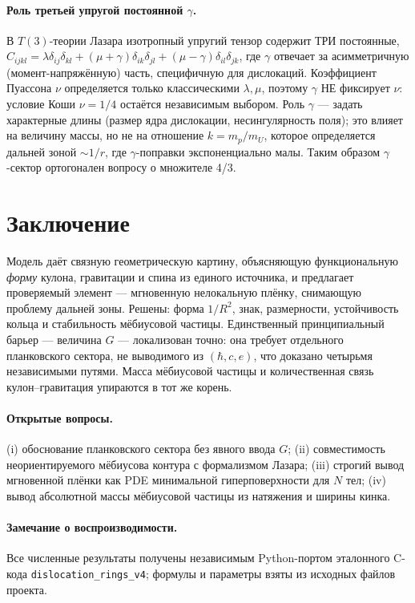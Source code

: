 \documentclass[11pt,a4paper]{article}
\begin{document}
\paragraph{Роль третьей упругой постоянной $\gamma$.} В $T(3)$-теории Лазара
изотропный упругий тензор содержит ТРИ постоянные,
$C_{ijkl}=\lambda\delta_{ij}\delta_{kl}+(\mu+\gamma)\delta_{ik}\delta_{jl}
+(\mu-\gamma)\delta_{il}\delta_{jk}$, где $\gamma$ отвечает за асимметричную
(момент-напряжённую) часть, специфичную для дислокаций. Коэффициент Пуассона
$\nu$ определяется только классическими $\lambda,\mu$, поэтому $\gamma$ НЕ
фиксирует $\nu$: условие Коши $\nu=1/4$ остаётся независимым выбором. Роль
$\gamma$ — задать характерные длины (размер ядра дислокации, несингулярность
поля); это влияет на величину массы, но не на отношение $k=m_p/m_U$, которое
определяется дальней зоной $\sim1/r$, где $\gamma$-поправки экспоненциально
малы. Таким образом $\gamma$-сектор ортогонален вопросу о множителе 4/3.

\section{Заключение}
Модель даёт связную геометрическую картину, объясняющую функциональную
\emph{форму} кулона, гравитации и спина из единого источника, и предлагает
проверяемый элемент --- мгновенную нелокальную плёнку, снимающую проблему
дальней зоны. Решены: форма $1/R^2$, знак, размерности, устойчивость кольца
и стабильность мёбиусовой частицы. Единственный принципиальный барьер ---
величина $G$ --- локализован точно: она требует отдельного планковского
сектора, не выводимого из $(\hbar,c,e)$, что доказано четырьмя независимыми
путями. Масса мёбиусовой частицы и количественная связь кулон--гравитация
упираются в тот же корень.

\paragraph{Открытые вопросы.}
(i) обоснование планковского сектора без явного ввода $G$;
(ii) совместимость неориентируемого мёбиусова контура с формализмом Лазара;
(iii) строгий вывод мгновенной плёнки как PDE минимальной гиперповерхности
для $N$ тел;
(iv) вывод абсолютной массы мёбиусовой частицы из натяжения и ширины кинка.

\paragraph{Замечание о воспроизводимости.}
Все численные результаты получены независимым Python-портом эталонного
C-кода \texttt{dislocation\_rings\_v4}; формулы и параметры взяты из
исходных файлов проекта.
\end{document}
